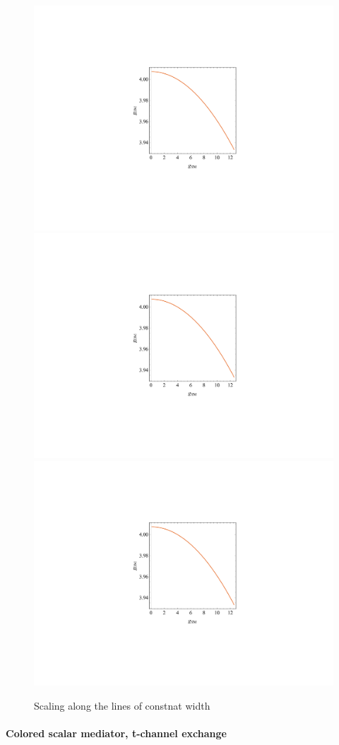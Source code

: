 \begin{figure}
\centering
\includegraphics[page=1, trim=310 200 310 200, clip, width=0.3\linewidth]{figures/monojet/rescalingexercise.pdf}
\includegraphics[page=2, trim=305 195 305 195, clip, width=0.3\linewidth]{figures/monojet/rescalingexercise.pdf}
\includegraphics[page=3, trim=300 190 300 190, clip, width=0.3\linewidth]{figures/monojet/rescalingexercise.pdf}
\caption{Scaling along the lines of constnat width}
\label{fig:monojet_scaling_constwidth}
\end{figure}


\paragraph{Colored scalar mediator, t-channel exchange}



